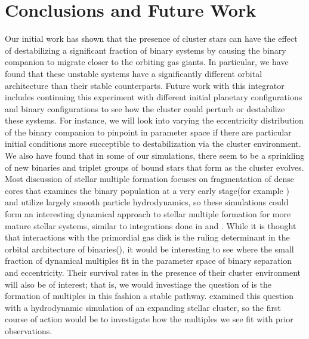 \documentclass[manuscript]{aastex631}
\begin{document}
\section{Conclusions and Future Work}
Our initial work has shown that the presence
of cluster stars can have the effect of destabilizing a significant fraction of binary systems by causing the binary companion to migrate closer to the orbiting gas giants.
In particular, we have found that these unstable systems have a significantly different orbital architecture than their stable counterparts. 
Future work with this integrator includes continuing this experiment with different initial planetary configurations and binary configurations to see how the cluster could
perturb or destabilize these systems. For instance, we will look into varying the eccentricity distribution of the binary companion to pinpoint in parameter space
if there are particular initial conditions more succeptible to destabilization via the cluster environment.
We also have found that in some of our simulations, there seem to be a sprinkling of new binaries and triplet groups of bound stars that form as the cluster evolves. 
Most discussion of stellar multiple formation focuses on fragmentation of dense cores that examines the binary population
at a very early stage(for example \cite{bon94}) and utilize largely smooth particle hydrodynamics, so these simulations could form an interesting dynamical approach to stellar multiple
formation for more mature stellar systems, similar to integrations done in \cite{kro01} and \cite{moe10}. While it is thought that interactions with the primordial gas disk is the ruling
determinant in the orbital architecture of binaries(\cite{kro01,krobur01,bat00}), it would be interesting to see where the small fraction of 
dynamical multiples fit in the parameter space of binary separation and eccentricity. Their survival rates in the presence of their cluster environment will also 
be of interest; that is, we would investiage the question of is the formation of multiples in this fashion a stable pathway.\cite{moe10} examined this question with a hydrodynamic
simulation of an expanding stellar cluster, so the first course of action would be to investigate how the multiples we see fit with prior observations.


\end{document}
